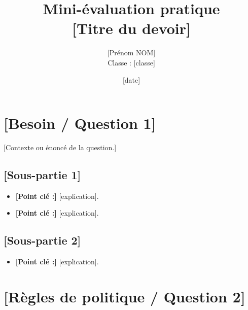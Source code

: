 \documentclass[11pt,a4paper]{article}
\title{\textbf{Mini-évaluation pratique\\{}[Titre du devoir]}}
\author{[Prénom NOM]\\ Classe : [classe]}
\date{[date]}     %
\begin{document}
  \maketitle
  \thispagestyle{empty}   %

  \section{[Besoin / Question 1]}

  [Contexte ou énoncé de la question.]

  \subsection{[Sous-partie 1]}

  \begin{itemize}
    \item \textbf{[Point clé :]} [explication].
    \item \textbf{[Point clé :]} [explication].
  \end{itemize}

  \subsection{[Sous-partie 2]}

  \begin{itemize}
    \item \textbf{[Point clé :]} [explication].
  \end{itemize}



  \section{[Règles de politique / Question 2]}
\end{document}

